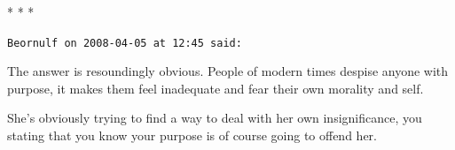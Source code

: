 
\begin{center}* * *\end{center}

\begin{footnotesize}
\begin{sffamily}
\texttt{Beornulf on 2008-04-05 at 12:45 said:}

The answer is resoundingly obvious. People of modern times despise anyone with purpose, it makes them feel inadequate and fear their own morality and self.

She's obviously trying to find a way to deal with her own insignificance, you stating that you know your purpose is of course going to offend her.


\hfill

\end{sffamily}
\end{footnotesize}

